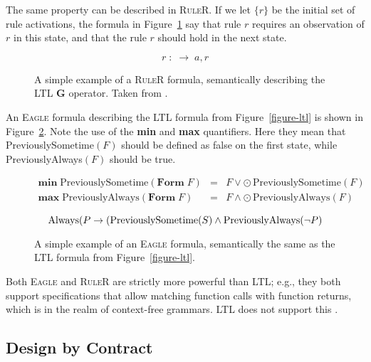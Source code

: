 The same property can be described in \textsc{RuleR}. If we let $\{r\}$ be the
initial set of rule activations, the formula in
Figure~\ref{figure-ruler-always} say that rule $r$ requires an observation of
$r$ in this state, and that the rule $r$ should hold in the next state.

\begin{figure}[h!]
	\[
    r \; : \; \rightarrow \; a,r
	\]

	\caption{A simple example of a \textsc{RuleR} formula, semantically describing the
  LTL $\boldsymbol{G}$ operator. Taken from \cite{barringer07ruler}.}
	\label{figure-ruler-always}
\end{figure}

An \textsc{Eagle} formula describing the LTL formula from
Figure~\ref{figure-ltl} is shown in Figure~\ref{figure-eagle-ltl}. Note the use
of the \textbf{min} and \textbf{max} quantifiers. Here they mean that
PreviouslySometime$(F)$ should be defined as false on the first state, while
PreviouslyAlways$(F)$ should be true.


\begin{figure}[h!]
  \[
  \begin{array}{rcl}
    \textbf{min} \; \text{PreviouslySometime}(\textbf{Form} \; F) & = & F \vee \odot \, \text{PreviouslySometime}(F) \\
      \textbf{max} \; \text{PreviouslyAlways}(\textbf{Form} \; F) & = & F \wedge \odot \, \text{PreviouslyAlways}(F) \\
  \end{array}
  \]
  \[
    \text{Always}(P \rightarrow (\text{PreviouslySometime}(S) \wedge \text{PreviouslyAlways}(\neg P) \\
  \]

	\caption{A simple example of an \textsc{Eagle} formula, semantically the same as the
  LTL formula from Figure~\ref{figure-ltl}.}
	\label{figure-eagle-ltl}
\end{figure}

Both \textsc{Eagle} and \textsc{RuleR} are strictly more powerful than LTL;
e.g., they both support specifications that allow matching function calls with
function returns, which is in the realm of context-free grammars. LTL does not
support this \cite{barringer03eagle,barringer07ruler}.


\subsection{Design by Contract}

